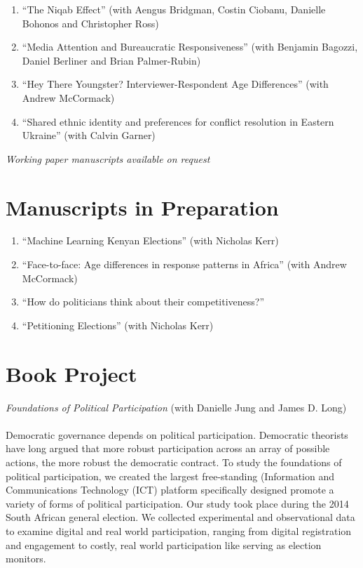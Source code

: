 \documentclass[margin,line]{res}
\begin{document}
{\begin{resume}
\begin{enumerate}
\item ``The Niqab Effect'' (with Aengus Bridgman, Costin Ciobanu, Danielle
Bohonos and Christopher Ross)

\item ``Media Attention and Bureaucratic Responsiveness'' (with Benjamin
Bagozzi, Daniel Berliner and Brian Palmer-Rubin)

\item ``Hey There Youngster? Interviewer-Respondent Age Differences'' (with Andrew McCormack)

\item ``Shared ethnic identity and preferences for conflict resolution in
Eastern Ukraine'' (with Calvin Garner)

\end{enumerate}
\centerline{\emph{Working paper manuscripts available on request}}


\section{\sc Manuscripts in Preparation}
\renewcommand{\labelenumi}{MP\theenumi.}

\begin{enumerate}
\item ``Machine Learning Kenyan Elections'' (with Nicholas Kerr)
\item ``Face-to-face: Age differences in response patterns in Africa''
  (with Andrew McCormack)
\item ``How do politicians think about their competitiveness?''
\item ``Petitioning Elections'' (with Nicholas Kerr)

\end{enumerate}

\section{\sc Book Project}
\emph{Foundations of Political Participation} (with Danielle Jung and
James D. Long)\\
\\
Democratic governance depends on political
 participation. Democratic theorists have long argued that more
  robust participation across an array of possible actions, the more
  robust the democratic contract. To study the foundations of
  political participation, we created the largest free-standing
  (Information and Communications Technology (ICT) platform
  specifically designed promote a variety of forms of political
  participation. Our study took place during the 2014 South African
  general election. We collected experimental and observational data
  to examine digital and real world participation, ranging from
  digital registration and engagement to costly, real world
  participation like serving as election monitors.



\end{resume}}
\end{document}
